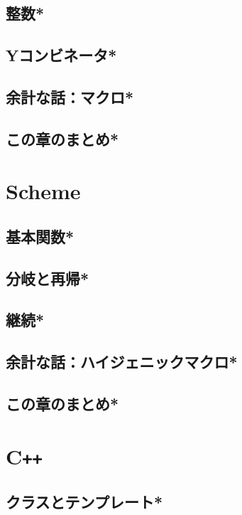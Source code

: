 \documentclass[a4paper,twocolumn]{jsbook}
\newcommand{\programminglanguage}[1]{\textsf{#1}}
\newcommand{\cxx}{\programminglanguage{C}\texttt{++}}
\newcommand{\scheme}{\programminglanguage{Scheme}}
\begin{document}
\section{整数*}
\section{Yコンビネータ*}


\section{余計な話：マクロ*}

\section{この章のまとめ*}


\chapter{\scheme}

\section{基本関数*}
\section{分岐と再帰*}
\section{継続*}
\section{余計な話：ハイジェニックマクロ*}
\section{この章のまとめ*}

\chapter{\cxx}

\section{クラスとテンプレート*}
\end{document}
